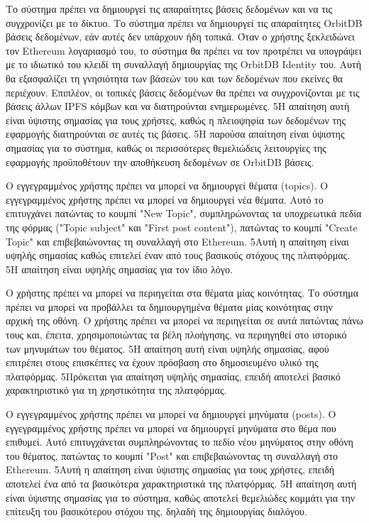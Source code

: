 \begin{enumerate}[label=\textbf{<ΛΑ-\arabic*>}, leftmargin=\parindent, align=left, labelwidth=\parindent, labelsep=0pt]
	\sysReqItem
		{\label{srs:functional-srs-create-user-databases}}
		{Το σύστημα πρέπει να δημιουργεί τις απαραίτητες βάσεις δεδομένων και να τις συγχρονίζει με το δίκτυο.}
		{Το σύστημα πρέπει να δημιουργεί τις απαραίτητες OrbitDB βάσεις δεδομένων, εάν αυτές δεν υπάρχουν ήδη τοπικά. Όταν ο χρήστης ξεκλειδώνει τον Ethereum λογαριασμό του, το σύστημα θα πρέπει να τον προτρέπει να υπογράψει με το ιδιωτικό του κλειδί τη συναλλαγή δημιουργίας της OrbitDB Identity του. Αυτή θα εξασφαλίζει τη γνησιότητα των βάσεών του και των δεδομένων που εκείνες θα περιέχουν. Επιπλέον, οι τοπικές βάσεις δεδομένων θα πρέπει να συγχρονίζονται με τις βάσεις άλλων IPFS κόμβων και να διατηρούνται ενημερωμένες.}
		{5}{Η απαίτηση αυτή είναι ύψιστης σημασίας για τους χρήστες, καθώς η πλειοψηφία των δεδομένων της εφαρμογής διατηρούνται σε αυτές τις βάσεις.}
		{5}{Η παρούσα απαίτηση είναι ύψιστης σημασίας για το σύστημα, καθώς οι περισσότερες θεμελιώδεις λειτουργίες της εφαρμογής προϋποθέτουν την αποθήκευση δεδομένων σε OrbitDB βάσεις.}

	\sysReqItem
		{\label{srs:functional-srs-create-topic}}
		{Ο εγγεγραμμένος χρήστης πρέπει να μπορεί να δημιουργεί θέματα (topics).}
		{Ο εγγεγραμμένος χρήστης πρέπει να μπορεί να δημιουργεί νέα θέματα. Αυτό το επιτυγχάνει πατώντας το κουμπί "New Topic", συμπληρώνοντας τα υποχρεωτικά πεδία της φόρμας ("Topic subject" και "First post content"), πατώντας το κουμπί "Create Topic" και επιβεβαιώνοντας τη συναλλαγή στο Ethereum.}
		{5}{Αυτή η απαίτηση είναι υψηλής σημασίας καθώς επιτελεί έναν από τους βασικούς στόχους της πλατφόρμας.}
		{5}{Η απαίτηση είναι υψηλής σημασίας για τον ίδιο λόγο.}

	\sysReqItem
		{\label{srs:functional-srs-browse-community-topics}}
		{Ο χρήστης πρέπει να μπορεί να περιηγείται στα θέματα μίας κοινότητας.}
		{Το σύστημα πρέπει να μπορεί να προβάλλει τα δημιουργημένα θέματα μίας κοινότητας στην αρχική της οθόνη. Ο χρήστης πρέπει να μπορεί να περιηγείται σε αυτά πατώντας πάνω τους και, έπειτα, χρησιμοποιώντας τα βέλη πλοήγησης, να περιηγηθεί στο ιστορικό των μηνυμάτων του θέματος.}
		{5}{Η απαίτηση αυτή είναι υψηλής σημασίας, αφού επιτρέπει στους επισκέπτες να έχουν πρόσβαση στο δημοσιευμένο υλικό της πλατφόρμας.}
		{5}{Πρόκειται για απαίτηση υψηλής σημασίας, επειδή αποτελεί βασικό χαρακτηριστικό για τη χρηστικότητα της πλατφόρμας.}

	\sysReqItem
		{\label{srs:functional-srs-create-post}}
		{Ο εγγεγραμμένος χρήστης πρέπει να μπορεί να δημιουργεί μηνύματα (posts).}
		{Ο εγγεγραμμένος χρήστης πρέπει να μπορεί να δημιουργεί μηνύματα στο θέμα που επιθυμεί. Αυτό επιτυγχάνεται συμπληρώνοντας το πεδίο νέου μηνύματος στην οθόνη του θέματος, πατώντας το κουμπί "Post" και επιβεβαιώνοντας τη συναλλαγή στο Ethereum.}
		{5}{Αυτή η απαίτηση είναι ύψιστης σημασίας για τους χρήστες, επειδή αποτελεί ένα από τα βασικότερα χαρακτηριστικά της πλατφόρμας.}
		{5}{Η απαίτηση αυτή είναι ύψιστης σημασίας για το σύστημα, καθώς αποτελεί θεμελιώδες κομμάτι για την επίτευξη του βασικότερου στόχου της, δηλαδή της δημιουργίας διαλόγου.}


\end{enumerate}
